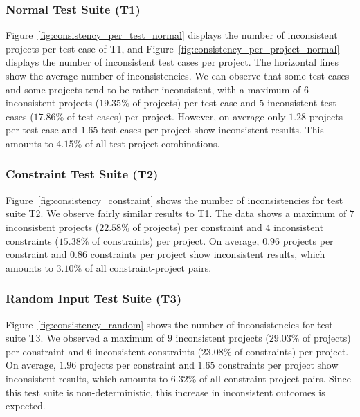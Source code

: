 \subsubsection{Normal Test Suite (T1)}

\noindent Figure~\ref{fig:consistency_per_test_normal} displays the number of inconsistent projects per test case of T1,
and Figure~\ref{fig:consistency_per_project_normal} displays the number of inconsistent test cases per project.
The horizontal lines show the average number of inconsistencies.
We can observe that some test cases and some projects tend to be rather inconsistent,
with a maximum of $6$ inconsistent projects ($19.35\%$ of projects) per test case and $5$ inconsistent test cases ($17.86\%$ of test cases) per project.
However, on average only $1.28$ projects per test case and $1.65$ test cases per project show inconsistent results.
This amounts to $4.15\%$ of all test-project combinations.

\subsubsection{Constraint Test Suite (T2)}

Figure~\ref{fig:consistency_constraint} shows the number of inconsistencies for test suite T2.
We observe fairly similar results to T1.
The data shows a maximum of $7$ inconsistent projects ($22.58\%$ of projects) per constraint and $4$ inconsistent constraints ($15.38\%$ of constraints) per project.
On average, $0.96$ projects per constraint and $0.86$ constraints per project show inconsistent results,
which amounts to $3.10\%$ of all constraint-project pairs.

\subsubsection{Random Input Test Suite (T3)}

Figure~\ref{fig:consistency_random} shows the number of inconsistencies for test suite T3.
We observed a maximum of $9$ inconsistent projects ($29.03\%$ of projects) per constraint and $6$ inconsistent constraints ($23.08\%$ of constraints) per project.
On average, $1.96$ projects per constraint and $1.65$ constraints per project show inconsistent results,
which amounts to $6.32\%$ of all constraint-project pairs.
Since this test suite is non-deterministic,
this increase in inconsistent outcomes is expected.

